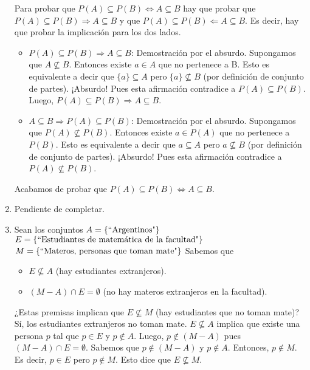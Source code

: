 \begin{enumerate}
  Para probar que $P(A) \subseteq P(B) \Leftrightarrow A \subseteq B$ hay que probar que $P(A) \subseteq P(B) \Rightarrow A \subseteq B$ y que $P(A) \subseteq P(B) \Leftarrow A \subseteq B$. Es decir, hay que probar la implicación para los dos lados.
  \begin{itemize}
  \item $P(A) \subseteq P(B) \Rightarrow A \subseteq B$:\newline
  Demostración por el absurdo. Supongamos que $A \not\subseteq B$. Entonces existe $a \in A$ que no pertenece a B. Esto es equivalente a decir que $\{a\} \subseteq A$ pero $\{a\} \not\subseteq B$ (por definición de conjunto de partes). ¡Absurdo! Pues esta afirmación contradice a $P(A) \subseteq P(B)$. Luego, $P(A) \subseteq P(B) \Rightarrow A \subseteq B$.

  \item $A \subseteq B \Rightarrow P(A) \subseteq P(B)$:\newline
  Demostración por el absurdo. Supongamos que $P(A) \not\subseteq P(B)$. Entonces existe $a \in P(A)$ que no pertenece a $P(B)$. Esto es equivalente a decir que $a \subseteq A$ pero $a \not\subseteq B$ (por definición de conjunto de partes). ¡Absurdo! Pues esta afirmación contradice a $P(A) \not\subseteq P(B)$.
  \end{itemize}
  Acabamos de probar que $P(A) \subseteq P(B) \Leftrightarrow A \subseteq B$.
\item %
  Pendiente de completar.
\item %
  Sean los conjuntos\newline
  $A = \{\textnormal{``Argentinos"}\}$\newline
  $E = \{\textnormal{``Estudiantes de matemática de la facultad"}\}$\newline
  $M = \{\textnormal{``Materos, personas que toman mate"}\}$\newline
  Sabemos que
  \begin{itemize}
  \item $E \not\subseteq A$ (hay estudiantes extranjeros).
  \item $(M-A) \cap E = \emptyset$ (no hay materos extranjeros en la facultad).
  \end{itemize}
  ¿Estas premisas implican que $E \not\subseteq M$ (hay estudiantes que no toman mate)?\newline
  Sí, los estudiantes extranjeros no toman mate.\newline
  $E \not\subseteq A$ implica que existe una persona $p$ tal que $p \in E$ y $p \notin A$. Luego, $p \notin (M-A)$ pues $(M-A) \cap E = \emptyset$. Sabemos que $p \notin (M-A)$ y $p \notin A$. Entonces, $p \notin M$. Es decir, $p \in E$ pero $p \notin M$. Esto dice que $E \not\subseteq M$.
\end{enumerate}

